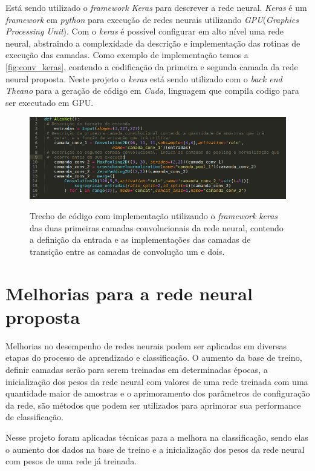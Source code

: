\par Está sendo utilizado o \textit{framework} \textit{Keras} \cite{chollet2015keras} para descrever a rede neural. \textit{Keras} é um \textit{framework} em \textit{python} para execução de redes neurais utilizando \textit{GPU}(\textit{Graphics Processing Unit}). Com o \textit{keras} é possível configurar em alto nível uma rede neural, abstraindo a complexidade da descrição e implementação das rotinas de execução das camadas. Como exemplo de implementação temos a \autoref{fig:conv_keras}, contendo a codificação da primeira e segunda camada da rede neural proposta. Neste projeto o \textit{keras} está sendo utilizado com o \textit{back end Theano} \cite{2016arXiv160502688full} para a geração de código em \textit{Cuda}, linguagem que compila codigo para ser executado em GPU.
\begin{figure}[H]
  \centering
  \caption{Trecho de código com implementação utilizando o \textit{framework} \textit{keras} das duas primeiras camadas convolucionais da rede neural, contendo a definição da entrada e as implementações das camadas de transição entre as camadas de convolução um e dois.}
  \includegraphics[width=400pt]{dados/figuras/exemplo_keras}
  \label{fig:conv_keras}
\end{figure}


\section{Melhorias para a rede neural proposta}

Melhorias no desempenho de redes neurais podem ser aplicadas em diversas etapas do processo de aprendizado e classificação. O aumento da base de treino, definir camadas serão para serem treinadas em determinadas épocas, a inicialização dos pesos da rede neural com valores de uma rede treinada com uma quantidade maior de amostras e o aprimoramento dos parâmetros de configuração da rede, são métodos que podem ser utilizados para aprimorar sua performance de classificação.

\par Nesse projeto foram aplicadas técnicas para a melhora na classificação, sendo elas
o aumento dos dados na base de treino e a inicialização dos pesos da rede neural com pesos de uma rede já treinada. %

